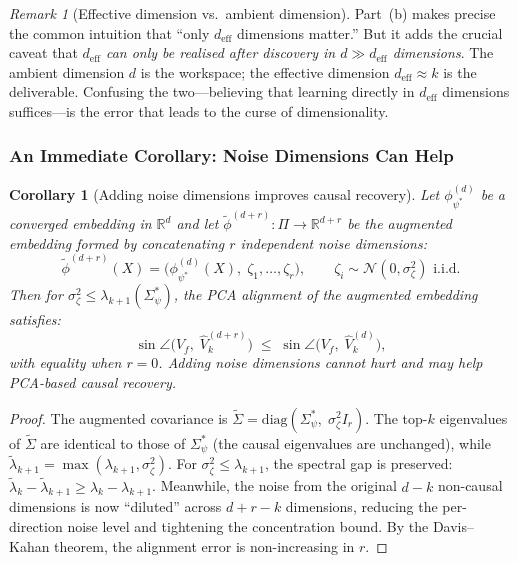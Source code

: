 \documentclass[11pt,a4paper]{article}
\theoremstyle{plain}
\newtheorem{corollary}[theorem]{Corollary}
\theoremstyle{definition}
\theoremstyle{remark}
\newtheorem{remark}[theorem]{Remark}
\newcommand{\R}{\mathbb{R}}
\newcommand{\cN}{\mathcal{N}}
\newcommand{\deff}{d_{\mathrm{eff}}}
\newcommand{\diag}{\mathrm{diag}}
\begin{document}
\begin{remark}[Effective dimension vs.\ ambient dimension]\label{rmk:deff-vs-k}
Part~(b) makes precise the common intuition that ``only $\deff$ dimensions
matter.''  But it adds the crucial caveat that \emph{$\deff$ can only be
realised after discovery in $d \gg \deff$ dimensions}.  The ambient dimension
$d$ is the workspace; the effective dimension $\deff \approx k$ is the
deliverable.  Confusing the two---believing that learning directly in $\deff$
dimensions suffices---is the error that leads to the curse of dimensionality.
\end{remark}

\subsubsection{An Immediate Corollary: Noise Dimensions Can Help}

\begin{corollary}[Adding noise dimensions improves causal recovery]%
\label{cor:noise-dims}
Let $\phi_{\psi^*}^{(d)}$ be a converged embedding in $\R^d$ and let
$\tilde{\phi}^{(d+r)} : \Pi \to \R^{d+r}$ be the \emph{augmented embedding}
formed by concatenating $r$ independent noise dimensions:
\begin{equation}
  \tilde{\phi}^{(d+r)}(X)
  = \bigl(\phi_{\psi^*}^{(d)}(X),\;
    \zeta_1, \ldots, \zeta_r\bigr),
  \qquad \zeta_i \sim \cN(0, \sigma_\zeta^2) \text{ i.i.d.}
\end{equation}
Then for $\sigma_\zeta^2 \leq \lambda_{k+1}(\Sigma_\psi^*)$, the PCA
alignment of the augmented embedding satisfies:
\begin{equation}\label{eq:noise-helps}
  \sin\angle\bigl(V_f,\;\hat{V}_k^{(d+r)}\bigr)
  \;\leq\;
  \sin\angle\bigl(V_f,\;\hat{V}_k^{(d)}\bigr),
\end{equation}
with equality when $r = 0$.  Adding noise dimensions \emph{cannot hurt and
may help} PCA-based causal recovery.
\end{corollary}

\begin{proof}
The augmented covariance is
$\tilde{\Sigma} = \diag(\Sigma_\psi^*,\; \sigma_\zeta^2 I_r)$.
The top-$k$ eigenvalues of $\tilde{\Sigma}$ are identical to those of
$\Sigma_\psi^*$ (the causal eigenvalues are unchanged), while
$\tilde{\lambda}_{k+1} = \max(\lambda_{k+1}, \sigma_\zeta^2)$.
For $\sigma_\zeta^2 \leq \lambda_{k+1}$, the spectral gap is preserved:
$\tilde{\lambda}_k - \tilde{\lambda}_{k+1} \geq \lambda_k - \lambda_{k+1}$.
Meanwhile, the noise from the original $d - k$ non-causal dimensions is now
``diluted'' across $d + r - k$ dimensions, reducing the per-direction noise
level and tightening the concentration bound.  By the Davis--Kahan theorem, the
alignment error is non-increasing in $r$.
\end{proof}
\end{document}
